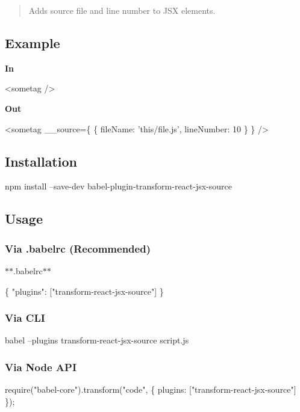 \begin{quote}
Adds source file and line number to J\+SX elements. \end{quote}


\subsection*{Example}

{\bfseries In}


\begin{DoxyCode}
<sometag />
\end{DoxyCode}


{\bfseries Out}


\begin{DoxyCode}
<sometag \_\_source=\{ \{ fileName: 'this/file.js', lineNumber: 10 \} \} />
\end{DoxyCode}


\subsection*{Installation}


\begin{DoxyCode}
npm install --save-dev babel-plugin-transform-react-jsx-source
\end{DoxyCode}


\subsection*{Usage}

\subsubsection*{Via {\ttfamily .babelrc} (Recommended)}

$\ast$$\ast$.babelrc$\ast$$\ast$


\begin{DoxyCode}
\{
  "plugins": ["transform-react-jsx-source"]
\}
\end{DoxyCode}


\subsubsection*{Via C\+LI}


\begin{DoxyCode}
babel --plugins transform-react-jsx-source script.js
\end{DoxyCode}


\subsubsection*{Via Node A\+PI}


\begin{DoxyCode}
require("babel-core").transform("code", \{
  plugins: ["transform-react-jsx-source"]
\});
\end{DoxyCode}
 